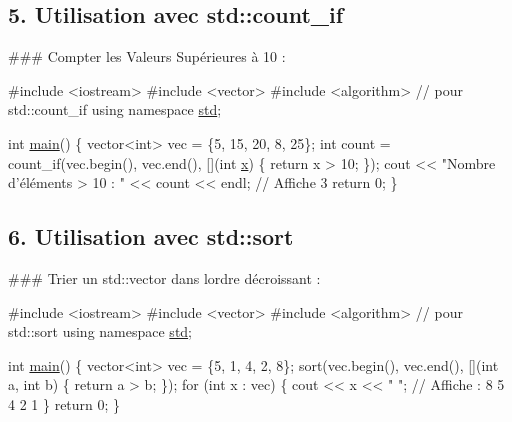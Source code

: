 \subsection*{5. Utilisation avec {\ttfamily std\+::count\+\_\+if}}

\#\#\# Compter les Valeurs Supérieures à 10 \+: 
\begin{DoxyCode}
\textcolor{preprocessor}{#include <iostream>}
\textcolor{preprocessor}{#include <vector>}
\textcolor{preprocessor}{#include <algorithm>} \textcolor{comment}{// pour std::count\_if}
\textcolor{keyword}{using namespace }\hyperlink{namespacestd}{std};

\textcolor{keywordtype}{int} \hyperlink{htop_8c_a3c04138a5bfe5d72780bb7e82a18e627}{main}() \{
    vector<int> vec = \{5, 15, 20, 8, 25\};
    \textcolor{keywordtype}{int} count = count\_if(vec.begin(), vec.end(), [](\textcolor{keywordtype}{int} \hyperlink{addition_8c_a6150e0515f7202e2fb518f7206ed97dc}{x}) \{ \textcolor{keywordflow}{return} x > 10; \});
    cout << \textcolor{stringliteral}{"Nombre d'éléments > 10 : "} << count << endl; \textcolor{comment}{// Affiche 3}
    \textcolor{keywordflow}{return} 0;
\}
\end{DoxyCode}
 



\subsection*{6. Utilisation avec {\ttfamily std\+::sort}}

\#\#\# Trier un {\ttfamily std\+::vector} dans l\textquotesingle{}ordre décroissant \+: 
\begin{DoxyCode}
\textcolor{preprocessor}{#include <iostream>}
\textcolor{preprocessor}{#include <vector>}
\textcolor{preprocessor}{#include <algorithm>} \textcolor{comment}{// pour std::sort}
\textcolor{keyword}{using namespace }\hyperlink{namespacestd}{std};

\textcolor{keywordtype}{int} \hyperlink{htop_8c_a3c04138a5bfe5d72780bb7e82a18e627}{main}() \{
    vector<int> vec = \{5, 1, 4, 2, 8\};
    sort(vec.begin(), vec.end(), [](\textcolor{keywordtype}{int} a, \textcolor{keywordtype}{int} b) \{ \textcolor{keywordflow}{return} a > b; \});
    \textcolor{keywordflow}{for} (\textcolor{keywordtype}{int} x : vec) \{
        cout << x << \textcolor{stringliteral}{" "}; \textcolor{comment}{// Affiche : 8 5 4 2 1}
    \}
    \textcolor{keywordflow}{return} 0;
\}
\end{DoxyCode}
 



